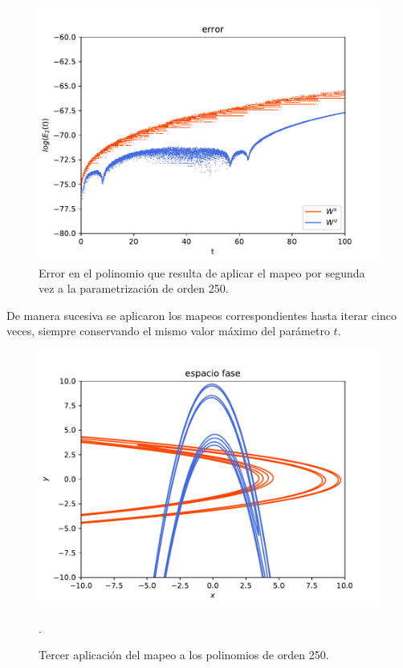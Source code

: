 \begin{figure}[H]
\centering
\includegraphics[scale=0.4]{error2ite}
\caption{Error en el polinomio que resulta de aplicar el mapeo por segunda vez a la parametrización de orden 250.}
\label{error-2iteracion}
\end{figure}

De manera sucesiva se aplicaron los mapeos correspondientes hasta iterar cinco veces, siempre conservando el mismo valor máximo del parámetro $t$.
\begin{figure}[H]
\centering
\includegraphics[scale=0.5]{rectangulo3}
\caption{Tercer aplicación del mapeo a los polinomios de orden 250.}.
\label{Rectangulo3}
\end{figure}

